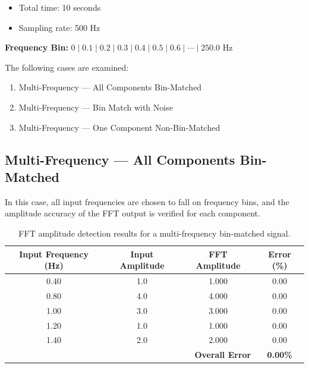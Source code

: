 \documentclass[a4paper, 12pt]{report}
\begin{document}
\begin{itemize}
    \item Total time: 10 seconds
    \item Sampling rate: 500 Hz
\end{itemize}

\textbf{Frequency Bin:} $0 \mid 0.1 \mid 0.2 \mid 0.3 \mid 0.4 \mid 0.5 \mid 0.6 \mid \cdots \mid 250.0$ Hz

The following cases are examined:

\begin{enumerate}
    \item Multi-Frequency — All Components Bin-Matched
    \item Multi-Frequency — Bin Match with Noise
    \item Multi-Frequency — One Component Non-Bin-Matched
\end{enumerate}

\subsection{Multi-Frequency — All Components Bin-Matched}

In this case, all input frequencies are chosen to fall on frequency bins, and the amplitude
accuracy of the FFT output is verified for each component.

\begin{table}[htbp]
\centering
\caption{FFT amplitude detection results for a multi-frequency bin-matched signal.}
\label{tab:mf_binmatch}
\begin{tabular}{cccc}
\toprule
\textbf{Input Frequency (Hz)} & \textbf{Input Amplitude} & \textbf{FFT Amplitude} & \textbf{Error (\%)} \\
\midrule
0.40  & 1.0 & 1.000 & 0.00 \\
0.80  & 4.0 & 4.000 & 0.00 \\
1.00  & 3.0 & 3.000 & 0.00 \\
1.20  & 1.0 & 1.000 & 0.00 \\
1.40  & 2.0 & 2.000 & 0.00 \\
\midrule
\multicolumn{3}{r}{\textbf{Overall Error}} & \textbf{0.00\%} \\
\bottomrule
\end{tabular}
\end{table}
\end{document}
